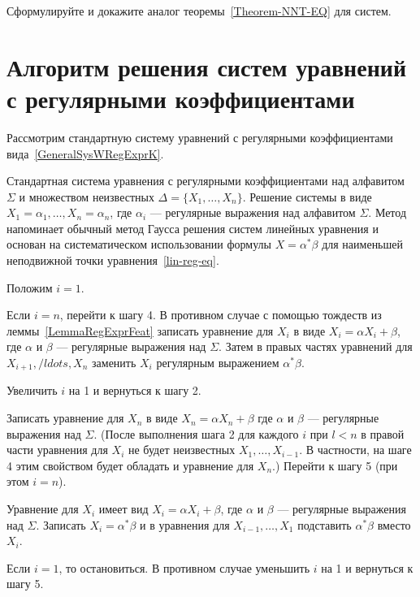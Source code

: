 \begin{myproblem}
Сформулируйте и докажите аналог теоремы~\ref{Theorem-NNT-EQ} для систем.
\end{myproblem}

\section{Алгоритм решения систем уравнений с регулярными коэффициентами}
\label{Chapter2SysSolverAlg}

Рассмотрим стандартную систему уравнений с регулярными коэффициентами вида~\eqref{GeneralSysWRegExprK}.


{\label{Algo-SysEq-Solver} Стандартная система уравнения с регулярными коэффициентами над алфавитом $\Sigma$ и множеством неизвестных $\Delta=\{X_1,\ldots ,X_n\}$.}
{Решение системы в виде $X_1=\alpha_1,\ldots, X_n=\alpha_n$, где $\alpha_i$ --- регулярные выражения над алфавитом $\Sigma$.}
{Метод напоминает обычный метод Гаусса решения систем линейных уравнения и основан на систематическом использовании формулы $X=\alpha^*\beta$ для наименьшей неподвижной точки уравнения~\eqref{lin-reg-eq}.}
 {
    \item Положим $i=1$.
		
    \item Если $i=n$, перейти к шагу 4. В противном случае с помощью тождеств из леммы~\ref{LemmaRegExprFeat} записать уравнение для $X_i$ в виде $X_i=\alpha X_i+\beta$, где $\alpha$ и $\beta$ --- регулярные выражения над $\Sigma$. Затем в правых частях уравнений для $X_{i+1}, /ldots , X_n$ заменить $X_i$ регулярным выражением $\alpha^*\beta$.

    \item Увеличить $i$ на 1 и вернуться к шагу 2.

    \item Записать уравнение для $X_n$ в виде $X_n=\alpha X_n+\beta$ где $\alpha$ и $\beta$ --- регулярные выражения над $\Sigma$. (После выполнения шага 2 для каждого $i$ при $l<n$ в правой части уравнения для $X_i$ не будет неизвестных $X_1, \ldots,X_{i-1}$. В частности, на шаге 4 этим свойством будет обладать и уравнение для $X_n$.) Перейти к шагу 5 (при этом $i=n$).

    \item Уравнение для $X_i$ имеет вид $X_i=\alpha X_i+\beta$, где $\alpha$ и $\beta$ --- регулярные выражения над $\Sigma$. Записать $X_i=\alpha^*\beta$ и в уравнения для $X_{i-1}, \ldots , X_1$ подставить $\alpha^*\beta$ вместо $X_i$.

    \item Если $i=1$, то остановиться. В противном случае уменьшить $i$ на 1 и вернуться к шагу 5.
		}

